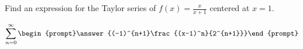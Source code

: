 \documentclass{ximera}
\author{Gregory Hartman \and Matthew Carr}
\begin{document}
\begin{exercise}






Find an expression for the Taylor series of $f(x)=\frac{x}{x+1}$ centered at $x=1$.

\[
\sum_{n=0}^{\infty}\begin{prompt}\answer{(-1)^{n+1}\frac{(x-1)^n}{2^{n+1}}}\end{prompt}
\]

\end{exercise}
\end{document}
